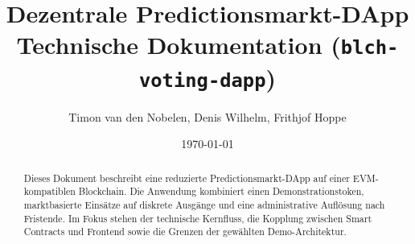 \documentclass[11pt,a4paper]{article}
\title{Dezentrale Predictionsmarkt-DApp\\\large Technische Dokumentation (\texttt{blch-voting-dapp})}
\author{Timon van den Nobelen, Denis Wilhelm, Frithjof Hoppe}
\date{\today}
\begin{document}
\maketitle

\begin{abstract}
Dieses Dokument beschreibt eine reduzierte Predictionsmarkt-DApp auf einer
EVM-kompatiblen Blockchain. Die Anwendung kombiniert einen Demonstrationstoken,
marktbasierte Einsätze auf diskrete Ausgänge und eine administrative Auflösung
nach Fristende. Im Fokus stehen der technische Kernfluss, die Kopplung zwischen
Smart Contracts und Frontend sowie die Grenzen der gewählten Demo-Architektur.
\end{abstract}
\hypersetup{pageanchor=true}






% 
\end{document}
